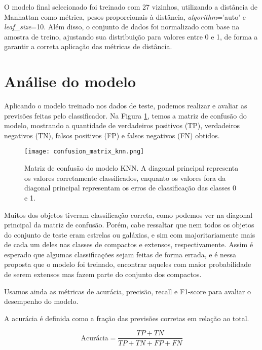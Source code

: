O modelo final selecionado foi treinado com 27 vizinhos, utilizando a distância de Manhattan como métrica, pesos proporcionais à distância, \textit{algorithm}='auto' e \textit{leaf\_size}=10. Além disso, o conjunto de dados foi normalizado com base na amostra de treino, ajustando sua distribuição para valores entre 0 e 1, de forma a garantir a correta aplicação das métricas de distância.

\section{Análise do modelo}

Aplicando o modelo treinado nos dados de teste, podemos realizar e avaliar as previsões feitas pelo classificador. Na Figura \ref{confusion_matrix_knn}, temos a matriz de confusão do modelo, mostrando a quantidade de verdadeiros positivos (TP), verdadeiros negativos (TN), falsos positivos (FP) e falsos negativos (FN) obtidos.

\begin{figure}[!ht]
    \centering
    \texttt{[image: confusion\_matrix\_knn.png]}
    \caption[]{Matriz de confusão do modelo KNN. A diagonal principal representa os valores corretamente classificados, enquanto os valores fora da diagonal principal representam os erros de classificação das classes 0 e 1.}
    \label{confusion_matrix_knn}
\end{figure}

\vspace{\baselineskip}

Muitos dos objetos tiveram classificação correta, como podemos ver na diagonal principal da matriz de confusão. Porém, cabe ressaltar que nem todos os objetos do conjunto de teste eram estrelas ou galáxias, e sim com majoritariamente mais de cada um deles nas classes de compactos e extensos, respectivamente. Assim é esperado que algumas classificações sejam feitas de forma errada, e é nessa proposta que o modelo foi treinado, encontrar aqueles com maior probabilidade de serem extensos mas fazem parte do conjunto dos compactos.

\vspace{\baselineskip}

Usamos ainda as métricas de acurácia, precisão, recall e F1-score para avaliar o desempenho do modelo.

A acurácia é definida como a fração das previsões corretas em relação ao total. 

\begin{equation}
    \text{Acurácia} = \frac{TP + TN}{TP + TN + FP + FN}
\end{equation}

